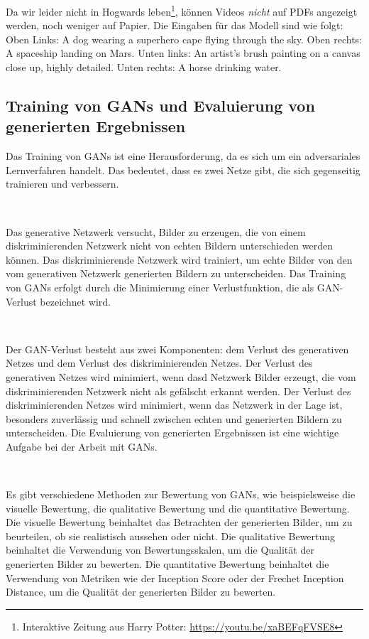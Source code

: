         Da wir leider nicht in Hogwards leben\footnote{Interaktive Zeitung aus Harry Potter: \url{https://youtu.be/xaBEFqFVSE8}}, können Videos \textit{nicht} auf PDFs angezeigt werden, noch weniger auf Papier. Die Eingaben für das Modell sind wie folgt: 
        Oben Links: A dog wearing a superhero cape flying through the sky.
        Oben rechts: A spaceship landing on Mars.
        Unten links: An artist's brush painting on a canvas close up, highly detailed. 
        Unten rechts: A horse drinking water.
        

    \subsection{Training von GANs und Evaluierung von generierten Ergebnissen}

        Das Training von GANs ist eine Herausforderung, da es sich um ein adversariales Lernverfahren handelt.      
        Das bedeutet, dass es zwei Netze gibt, die sich gegenseitig trainieren und verbessern.      %

        ~
        
        Das generative Netzwerk versucht, Bilder zu erzeugen, die von einem diskriminierenden Netzwerk nicht von echten Bildern unterschieden werden können.      
        Das diskriminierende Netzwerk wird trainiert, um echte Bilder von den vom generativen Netzwerk generierten Bildern zu unterscheiden.
        Das Training von GANs erfolgt durch die Minimierung einer Verlustfunktion, die als GAN-Verlust bezeichnet wird.

        ~
        
        Der GAN-Verlust besteht aus zwei Komponenten: dem Verlust des generativen Netzes und dem Verlust des diskriminierenden Netzes.      
        Der Verlust des generativen Netzes wird minimiert, wenn dasd Netzwerk Bilder erzeugt, die vom diskriminierenden Netzwerk nicht als gefälscht erkannt werden.      
        Der Verlust des diskriminierenden Netzes wird minimiert, wenn das Netzwerk in der Lage ist, besonders zuverlässig und schnell zwischen echten und generierten Bildern zu unterscheiden.
        Die Evaluierung von generierten Ergebnissen ist eine wichtige Aufgabe bei der Arbeit mit GANs.

~

        Es gibt verschiedene Methoden zur Bewertung von GANs, wie beispielsweise die visuelle Bewertung, die qualitative Bewertung und die quantitative Bewertung.  
        Die visuelle Bewertung beinhaltet das Betrachten der generierten Bilder, um zu beurteilen, ob sie realistisch aussehen oder nicht.      
        Die qualitative Bewertung beinhaltet die Verwendung von Bewertungsskalen, um die Qualität der generierten Bilder zu bewerten.      
        Die quantitative Bewertung beinhaltet die Verwendung von Metriken wie der Inception Score oder der Frechet Inception Distance, um die Qualität der generierten Bilder zu bewerten.

